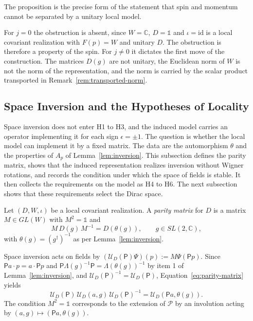 \noindent The proposition is the precise form of the statement that spin and momentum cannot be separated by a unitary local model.

\begin{remark}
	For $j=0$ the obstruction is absent, since $W=\mathbb{C}$, $D=\mathbb{1}$ and $\iota=\mathrm{id}$ is a local covariant realization with $F(p)=W$ and unitary $D$. The obstruction is therefore a property of the spin. For $j\neq0$ it dictates the first move of the construction. The matrices $D(g)$ are not unitary, the Euclidean norm of $W$ is not the norm of the representation, and the norm is carried by the scalar product transported in Remark~\ref{rem:transported-norm}.
\end{remark}

\subsection{Space Inversion and the Hypotheses of Locality}
\label{subsec:parity-hypotheses}

Space inversion does not enter H1 to H3, and the induced model carries an operator implementing it for each sign $\epsilon=\pm1$. The question is whether the local model can implement it by a fixed matrix. The data are the automorphism $\theta$ and the properties of $A_p$ of Lemma~\ref{lem:inversion}. This subsection defines the parity matrix, shows that the induced representation realizes inversion without Wigner rotations, and records the condition under which the space of fields is stable. It then collects the requirements on the model as H4 to H6. The next subsection shows that these requirements select the Dirac space.

\begin{definition}\label{def:parity-realization}
	Let $(D,W,\iota)$ be a local covariant realization. A \emph{parity matrix} for $D$ is a matrix $M\in GL(W)$ with $M^2=\mathbb{1}$ and
	\begin{equation}\label{eq:parity-matrix}
		M\,D(g)\,M^{-1}=D(\theta(g)),\qquad g\in SL(2,\mathbb{C}),
	\end{equation}
	with $\theta(g)=(g^\dagger)^{-1}$ as per Lemma~\ref{lem:inversion}.
\end{definition}

\begin{remark}\label{rem:parity-action}
	Space inversion acts on fields by $(\mathcal{U}_D(\mathsf{P})\Psi)(p):=M\Psi(\mathsf{P}p)$. Since $\mathsf{P}a\cdot p=a\cdot\mathsf{P}p$ and $\mathsf{P}\Lambda(g)^{-1}\mathsf{P}=\Lambda(\theta(g))^{-1}$ by item 1 of Lemma~\ref{lem:inversion}, and $\mathcal{U}_D(\mathsf{P})^{-1}=\mathcal{U}_D(\mathsf{P})$, Equation~\eqref{eq:parity-matrix} yields
	\begin{equation*}
		\mathcal{U}_D(\mathsf{P})\,\mathcal{U}_D(a,g)\,\mathcal{U}_D(\mathsf{P})^{-1}=\mathcal{U}_D(\mathsf{P}a,\theta(g)).
	\end{equation*}
	The condition $M^2=\mathbb{1}$ corresponds to the extension of $\mathcal{P}$ by an involution acting by $(a,g)\mapsto(\mathsf{P}a,\theta(g))$.
\end{remark}


